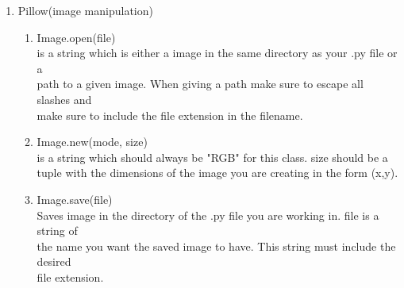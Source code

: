 \documentclass[11pt, letterpaper, onecolumn, oneside, final]{article}
\begin{document}
\begin{enumerate}
\begin{enumerate}
        \item {\consolas audio = generate\_music\_note(note, duration, wavetype, gain=0)} \\
        \hspace*{8mm}Generates a musical note of length {\consolas duration} milliseconds, with 
        \hspace*{8mm}a {\consolas wavetype} wave generator, and with an optional gain applied. \hspace*{8mm}{\consolas note} is specified in a string of the form: \\\\
        \hspace*{8mm}(Letter)(\#, b or (empty string))(Octave number). \\\\
        Examples, 'C\#4', 'C3', 'ab2'
        
\end{enumerate}



\item Pillow(image manipulation)
\begin{enumerate}
    \item {\consolas Image.open(file)}\\
    \hspace*{8mm}{\consolas file}is a string which is either a image in the same directory as your .py file or a \\
    \hspace*{8mm}path to a given image. When giving a path make sure to escape all slashes and\\
    \hspace*{8mm}make sure to include the file extension in the filename.
    
    \item {\consolas Image.new(mode, size) }\\
    \hspace*{8mm}{\consolas mode}is a string which should always be {\cosolas "RGB"} for this class. {\consolas size} should be a\\
    \hspace*{8mm}tuple with the dimensions of the image you are creating in the form (x,y).
    
    \item {\consolas Image.save(file)}\\
    \hspace*{8mm} Saves image in the directory of the .py file you are working in. {\consola file} is a string of\\
    \hspace*{8mm}the name you want the saved image to have. This string must include the desired\\
    \hspace*{8mm}file extension.
    

\end{enumerate}
\end{enumerate}
\end{document}
